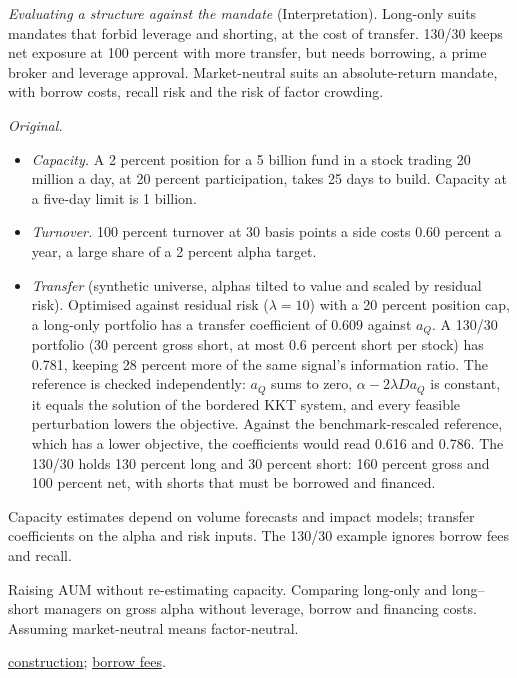 \begin{qfmethod}
\emph{Evaluating a structure against the mandate} (Interpretation). Long-only suits mandates that forbid leverage and shorting, at the cost of transfer. 130/30 keeps net exposure at 100 percent with more transfer, but needs borrowing, a prime broker and leverage approval. Market-neutral suits an absolute-return mandate, with borrow costs, recall risk and the risk of factor crowding.

 \emph{Original.}
\begin{itemize}
\item \emph{Capacity.} A 2 percent position for a 5 billion fund in a stock trading 20 million a day, at 20 percent participation, takes 25 days to build. Capacity at a five-day limit is 1 billion.
\item \emph{Turnover.} 100 percent turnover at 30 basis points a side costs 0.60 percent a year, a large share of a 2 percent alpha target.
\item \emph{Transfer} (synthetic universe, alphas tilted to value and scaled by residual risk). Optimised against residual risk ($\lambda=10$) with a 20 percent position cap, a long-only portfolio has a transfer coefficient of 0.609 against $a_Q$. A 130/30 portfolio (30 percent gross short, at most 0.6 percent short per stock) has 0.781, keeping 28 percent more of the same signal's information ratio. The reference is checked independently: $a_Q$ sums to zero, $\alpha-2\lambda Da_Q$ is constant, it equals the solution of the bordered KKT system, and every feasible perturbation lowers the objective. Against the benchmark-rescaled reference, which has a lower objective, the coefficients would read 0.616 and 0.786. The 130/30 holds 130 percent long and 30 percent short: 160 percent gross and 100 percent net, with shorts that must be borrowed and financed.
\end{itemize}

 Capacity estimates depend on volume forecasts and impact models; transfer coefficients on the alpha and risk inputs. The 130/30 example ignores borrow fees and recall.

 Raising AUM without re-estimating capacity. Comparing long-only and long--short managers on gross alpha without leverage, borrow and financing costs. Assuming market-neutral means factor-neutral.

 \hyperref[meth:active-equity-portfolio-construction]{construction}; \hyperref[def:securities-lending-fee-rebate]{borrow fees}.

\end{qfmethod}
